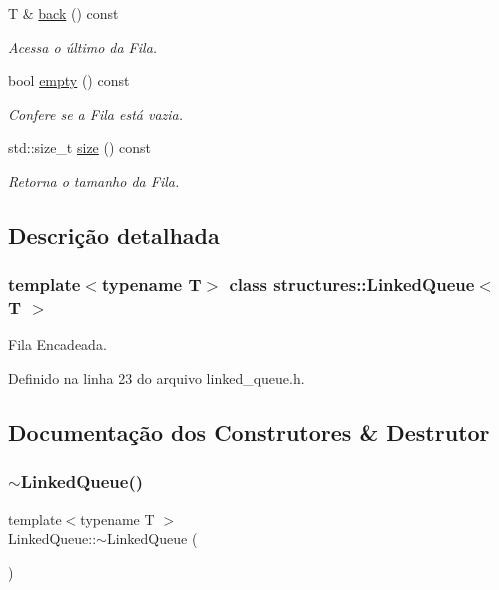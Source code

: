 \begin{DoxyCompactItemize}
T \& \mbox{\hyperlink{classstructures_1_1_linked_queue_a194d5842787ddffafecfb44bd14e8d9d}{back}} () const
\begin{DoxyCompactList}\small\item\em Acessa o último da Fila. \end{DoxyCompactList}\item 
bool \mbox{\hyperlink{classstructures_1_1_linked_queue_af956750d6053c0fcb41914615a1a3bfe}{empty}} () const
\begin{DoxyCompactList}\small\item\em Confere se a Fila está vazia. \end{DoxyCompactList}\item 
std\+::size\+\_\+t \mbox{\hyperlink{classstructures_1_1_linked_queue_a97af1a092fe5f7f15182bf93d1bc396d}{size}} () const
\begin{DoxyCompactList}\small\item\em Retorna o tamanho da Fila. \end{DoxyCompactList}\end{DoxyCompactItemize}


\subsection{Descrição detalhada}
\subsubsection*{template$<$typename T$>$\newline
class structures\+::\+Linked\+Queue$<$ T $>$}

Fila Encadeada. 

Definido na linha 23 do arquivo linked\+\_\+queue.\+h.



\subsection{Documentação dos Construtores \& Destrutor}
\mbox{\label{classstructures_1_1_linked_queue_ab08efd98f87a1dcd7a2c40588778cb80}} 
\subsubsection{\texorpdfstring{$\sim$LinkedQueue()}{~LinkedQueue()}}
{\footnotesize\ttfamily template$<$typename T $>$ \\
Linked\+Queue\+::$\sim$\+Linked\+Queue (\begin{DoxyParamCaption}{ }\end{DoxyParamCaption})}



